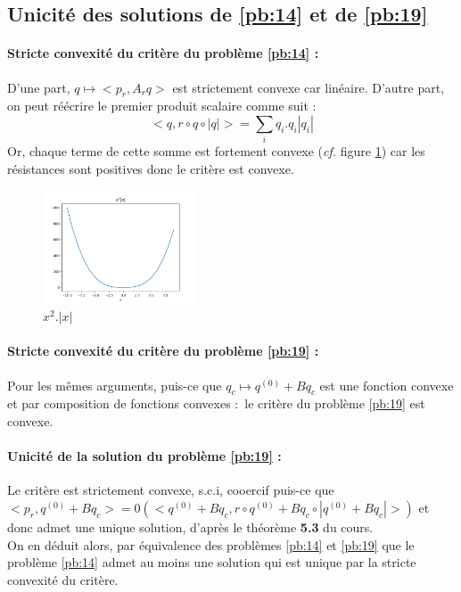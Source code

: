 \documentclass{article}
\begin{document}
    \subsection{Unicité des solutions de \ref{pb:14} et de \ref{pb:19}}

    \paragraph{Stricte convexité du critère du problème \ref{pb:14} :}D'une part, $q \mapsto <p_r, A_rq>$ est strictement convexe car linéaire. D'autre part, on peut réécrire le premier produit scalaire comme suit :
    \[<q, r\circ q \circ|q|> = \sum_i q_i.q_i|q_i|\]
    Or, chaque terme de cette somme est fortement convexe (\textit{cf.} figure \ref{courbe}) car les résistances sont positives donc le critère est convexe.
    \begin{figure}
        \begin{center}
            \includegraphics[width=0.4\textwidth]{courbe.png}
        \end{center}
            \caption{$x^2.|x|$}
            \label{courbe}
    \end{figure}

    \paragraph{Stricte convexité du critère du problème \ref{pb:19} :} Pour les mêmes arguments, puis-ce que $q_c \mapsto q^{(0)} + Bq_c$ est une fonction convexe et par composition de fonctions convexes : le critère du problème \ref{pb:19} est convexe.

    \paragraph{Unicité de la solution du problème \ref{pb:19} :} Le critère est strictement convexe, s.c.i, cooercif puis-ce que $<p_r, q^{(0)} + Bq_c> = 0(<q^{(0)} + Bq_c, r\circ q^{(0)} + Bq_c \circ|q^{(0)} + Bq_c|>)$ et donc admet une unique solution, d'après le théorème \textbf{5.3} du cours.\\
    On en déduit alors, par équivalence des problèmes \ref{pb:14} et \ref{pb:19} que le problème \ref{pb:14} admet au moins une solution qui est unique par la stricte convexité du critère.
\end{document}

